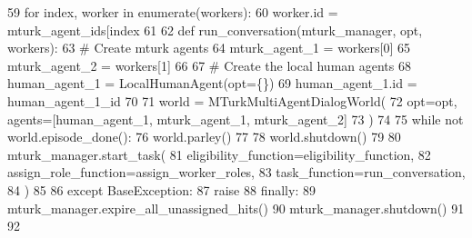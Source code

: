 \begin{DoxyCode}
59             \textcolor{keywordflow}{for} index, worker \textcolor{keywordflow}{in} enumerate(workers):
60                 worker.id = mturk\_agent\_ids[index %
61 
62         \textcolor{keyword}{def }run\_conversation(mturk\_manager, opt, workers):
63             \textcolor{comment}{# Create mturk agents}
64             mturk\_agent\_1 = workers[0]
65             mturk\_agent\_2 = workers[1]
66 
67             \textcolor{comment}{# Create the local human agents}
68             human\_agent\_1 = LocalHumanAgent(opt=\{\})
69             human\_agent\_1.id = human\_agent\_1\_id
70 
71             world = MTurkMultiAgentDialogWorld(
72                 opt=opt, agents=[human\_agent\_1, mturk\_agent\_1, mturk\_agent\_2]
73             )
74 
75             \textcolor{keywordflow}{while} \textcolor{keywordflow}{not} world.episode\_done():
76                 world.parley()
77 
78             world.shutdown()
79 
80         mturk\_manager.start\_task(
81             eligibility\_function=eligibility\_function,
82             assign\_role\_function=assign\_worker\_roles,
83             task\_function=run\_conversation,
84         )
85 
86     \textcolor{keywordflow}{except} BaseException:
87         \textcolor{keywordflow}{raise}
88     \textcolor{keywordflow}{finally}:
89         mturk\_manager.expire\_all\_unassigned\_hits()
90         mturk\_manager.shutdown()
91 
92 
\end{DoxyCode}
